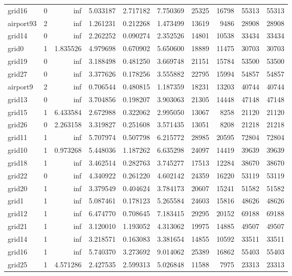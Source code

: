 \begin{longtable}{|l|r|r|r|r|r|r|r|r|r|}
grid16 & 0 & inf & 5.033187 & 2.717182 & 7.750369 & 25325 & 16798 & 55313 & 55313 \\
airport93 & 2 & inf & 1.261231 & 0.212268 & 1.473499 & 13619 & 9486 & 28908 & 28908 \\
grid14 & 0 & inf & 2.262252 & 0.090274 & 2.352526 & 14801 & 10538 & 33434 & 33434 \\
grid0 & 1 & 1.835526 & 4.979698 & 0.670902 & 5.650600 & 18889 & 11475 & 30703 & 30703 \\
grid19 & 0 & inf & 3.188498 & 0.481250 & 3.669748 & 21151 & 15784 & 53500 & 53500 \\
grid27 & 0 & inf & 3.377626 & 0.178256 & 3.555882 & 22795 & 15994 & 54857 & 54857 \\
airport9 & 2 & inf & 0.706544 & 0.480815 & 1.187359 & 18231 & 13203 & 40744 & 40744 \\
grid13 & 0 & inf & 3.704856 & 0.198207 & 3.903063 & 21305 & 14448 & 47148 & 47148 \\
grid15 & 1 & 6.433584 & 2.672988 & 0.322062 & 2.995050 & 13067 & 8258 & 21120 & 21120 \\
grid26 & 0 & 2.263158 & 3.319827 & 0.251608 & 3.571435 & 13051 & 8208 & 21218 & 21218 \\
grid11 & 1 & inf & 5.707974 & 0.507798 & 6.215772 & 28985 & 20595 & 72804 & 72804 \\
grid10 & 1 & 0.973268 & 5.448036 & 1.187262 & 6.635298 & 24097 & 14419 & 39639 & 39639 \\
grid18 & 1 & inf & 3.462514 & 0.282763 & 3.745277 & 17513 & 12284 & 38670 & 38670 \\
grid22 & 0 & inf & 4.340922 & 0.261220 & 4.602142 & 24359 & 16220 & 53119 & 53119 \\
grid20 & 1 & inf & 3.379549 & 0.404624 & 3.784173 & 20607 & 15241 & 51582 & 51582 \\
grid1 & 1 & inf & 5.087461 & 0.178123 & 5.265584 & 24603 & 15816 & 48626 & 48626 \\
grid12 & 1 & inf & 6.474770 & 0.708645 & 7.183415 & 29295 & 20152 & 69188 & 69188 \\
grid21 & 1 & inf & 3.120010 & 1.193052 & 4.313062 & 19975 & 14885 & 49507 & 49507 \\
grid14 & 1 & inf & 3.218571 & 0.163083 & 3.381654 & 14855 & 10592 & 33511 & 33511 \\
grid16 & 1 & inf & 5.740370 & 3.273692 & 9.014062 & 25389 & 16862 & 55403 & 55403 \\
grid25 & 1 & 4.571286 & 2.427535 & 2.599313 & 5.026848 & 11588 & 7975 & 23313 & 23313 \\

\end{longtable}
